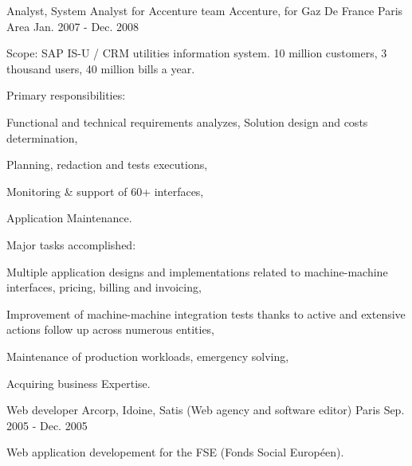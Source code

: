 \begin{cventries}
  \cventry
    {Analyst, System Analyst for Accenture team} %
    {Accenture, for Gaz De France} %
    {Paris Area} %
    {Jan. 2007 - Dec. 2008} %
    {
      \begin{cvitems} %
        \item {Scope: SAP IS-U / CRM utilities information system. 10 million customers, 3 thousand users, 40 million bills a year.}
        \item {Primary responsibilities:}
        \begin{cvsubitems}
          \item {Functional and technical requirements analyzes, Solution design and costs determination,}
          \item {Planning, redaction and tests executions,}
          \item {Monitoring \& support of 60+ interfaces,}
          \item {Application Maintenance.}
        \end{cvsubitems}
        \item {Major tasks accomplished:}
        \begin{cvsubitems}
          \item {Multiple application designs and implementations related to machine-machine interfaces, pricing, billing and invoicing,}
          \item {Improvement of machine-machine integration tests thanks to active and extensive actions follow up across numerous entities,}
          \item {Maintenance of production workloads, emergency solving,}
          \item {Acquiring business Expertise.}
        \end{cvsubitems}
      \end{cvitems}
    }

  \cventry
    {Web developer} %
    {Arcorp, Idoine, Satis (Web agency and software editor)} %
    {Paris} %
    {Sep. 2005 - Dec. 2005} %
    {
      \begin{cvitems} %
        \item {Web application developement for the FSE (Fonds Social Européen).}
      \end{cvitems}
    }

\end{cventries}
